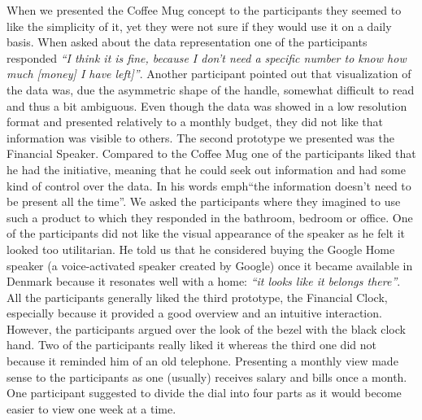 When we presented the Coffee Mug concept to the participants they seemed to like the simplicity of it, yet they were not sure if they would use it on a daily basis. When asked about the data representation one of the participants responded \emph{“I think it is fine, because I don’t need a specific number to know how much [money] I have left]”}. Another participant pointed out that visualization of the data was, due the asymmetric shape of the handle, somewhat difficult to read and thus a bit ambiguous. Even though the data was showed in a low resolution format and presented relatively to a monthly budget, they did not like that information was visible to others. The second prototype we presented was the Financial Speaker. Compared to the Coffee Mug one of the participants liked that he had the initiative, meaning that he could seek out information and had some kind of control over the data. In his words emph{“the information doesn’t need to be present all the time”}. We asked the participants where they imagined to use such a product to which they responded in the bathroom, bedroom or office. One of the participants did not like the visual appearance of the speaker as he felt it looked too utilitarian. He told us that he considered buying the Google Home speaker (a voice-activated speaker created by Google) once it became available in Denmark because it resonates well with a home: \emph{“it looks like it belongs there”}. All the participants generally liked the third prototype, the Financial Clock, especially because it provided a good overview and an intuitive interaction. However, the participants argued over the look of the bezel with the black clock hand. Two of the participants really liked it whereas the third one did not because it reminded him of an old telephone. Presenting a monthly view made sense to the participants as one (usually) receives salary and bills once a month. One participant suggested to divide the dial into four parts as it would become easier to view one week at a time.

